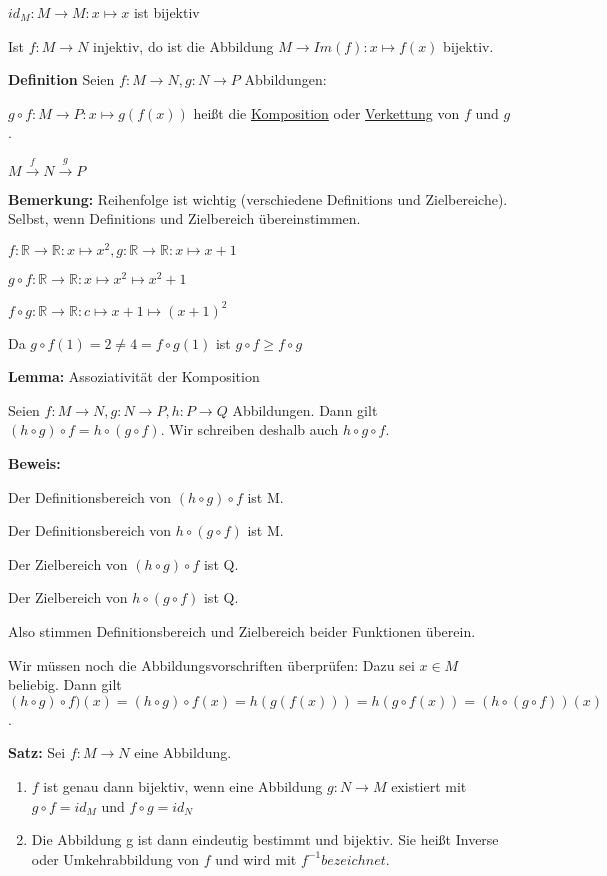 \documentclass[pdftex,12pt,a4paper,fleqn]{scrartcl}
\begin{document}
$id_M : M \rightarrow M : x \mapsto x$ ist bijektiv

Ist $f: M \rightarrow N$ injektiv, do ist die Abbildung $M \rightarrow Im(f): x \mapsto f(x)$ bijektiv.

\textbf{Definition} Seien $f: M \rightarrow N, g: N \rightarrow P$ Abbildungen:

$g \circ f : M \rightarrow P: x \mapsto g(f(x))$ heißt die \underline{Komposition} oder \underline{Verkettung} von $f$ und $g$.

$M \xrightarrow{f} N \xrightarrow{g} P$

\textbf{Bemerkung:} Reihenfolge ist wichtig (verschiedene Definitions und Zielbereiche). Selbst, wenn Definitions und Zielbereich übereinstimmen.

$f: \mathbb{R} \rightarrow \mathbb{R} : x \mapsto x^2, g: \mathbb{R} \rightarrow \mathbb{R}: x \mapsto x+1$

$g \circ f: \mathbb{R} \rightarrow \mathbb{R}: x \mapsto x^2 \mapsto x^2+1$

$f \circ g: \mathbb{R} \rightarrow \mathbb{R}: c \mapsto x+1 \mapsto (x+1)^2$

Da $g \circ f(1)=2 \neq 4 = f \circ g(1)$ ist $g \circ f \geq f \circ g$

\textbf{Lemma:} Assoziativität der Komposition 

Seien $f: M \rightarrow N, g: N \rightarrow P, h: P \rightarrow Q$ Abbildungen. Dann gilt $(h \circ g) \circ f = h \circ (g \circ f)$. Wir schreiben deshalb auch $h \circ g \circ f$.

\textbf{Beweis:} 

Der Definitionsbereich von $(h \circ g) \circ f$ ist M.

Der Definitionsbereich von $h \circ (g \circ f)$ ist M.


Der Zielbereich von $(h \circ g) \circ f$ ist Q.

Der Zielbereich von $h \circ (g \circ f)$ ist Q.


Also stimmen Definitionsbereich und Zielbereich beider Funktionen überein.

Wir müssen noch die Abbildungsvorschriften überprüfen: Dazu sei $x \in M$ beliebig. Dann gilt $(h \circ g) \circ f) (x) = (h \circ g) \circ  f(x) = h(g(f(x))) = h(g \circ f(x)) = (h \circ (g \circ f)) (x)$. 

\textbf{Satz:} Sei $f: M \rightarrow N$ eine Abbildung.

\begin{enumerate}[label=\alph*)]
    \item $f$ ist genau dann bijektiv, wenn eine Abbildung $g: N \rightarrow M$ existiert mit $g \circ f = id_M$ und $f \circ g = id_N$
    \item Die Abbildung g ist dann eindeutig bestimmt und bijektiv. Sie heißt Inverse oder Umkehrabbildung von $f$ und wird mit $f^{-1} bezeichnet$.  
\end{enumerate}
\end{document}
